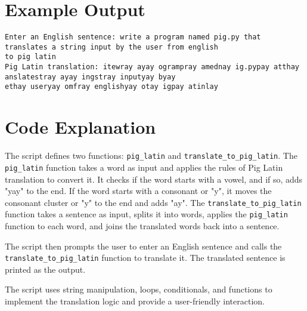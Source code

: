 \documentclass{article}
\begin{document}
\section{Example Output}

\begin{adjustwidth}{-4cm}{}\begin{verbatim}
Enter an English sentence: write a program named pig.py that translates a string input by the user from english
to pig latin
Pig Latin translation: itewray ayay ogrampray amednay ig.pypay atthay anslatestray ayay ingstray inputyay byay
ethay useryay omfray englishyay otay igpay atinlay
\end{verbatim}\end{adjustwidth}

\section{Code Explanation}
The script defines two functions: \texttt{pig\_latin} and \texttt{translate\_to\_pig\_latin}. The \texttt{pig\_latin} function takes a word as input and applies the rules of Pig Latin translation to convert it. It checks if the word starts with a vowel, and if so, adds "yay" to the end. If the word starts with a consonant or "y", it moves the consonant cluster or "y" to the end and adds "ay". The \texttt{translate\_to\_pig\_latin} function takes a sentence as input, splits it into words, applies the \texttt{pig\_latin} function to each word, and joins the translated words back into a sentence.

The script then prompts the user to enter an English sentence and calls the \texttt{translate\_to\_pig\_latin} function to translate it. The translated sentence is printed as the output.

The script uses string manipulation, loops, conditionals, and functions to implement the translation logic and provide a user-friendly interaction.
\end{document}

